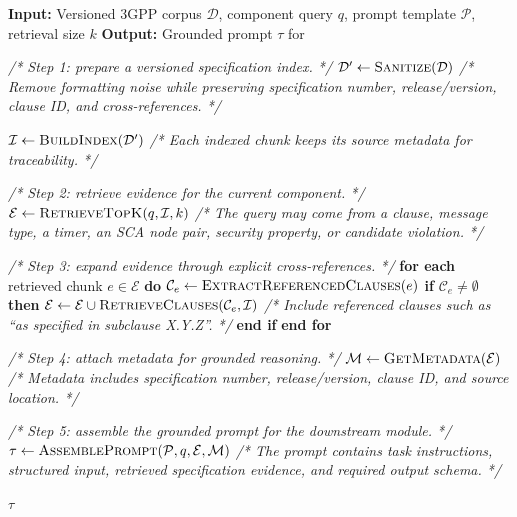 \begin{algorithm}[ht]
\caption{\textit{SpecAdaptation}}
\label{alg:rag_prompt}
\scriptsize
\begin{algorithmic}[1]

\State \textbf{Input:} Versioned 3GPP corpus $\mathcal{D}$, component query $q$, prompt template $\mathcal{P}$, retrieval size $k$
\State \textbf{Output:} Grounded prompt $\tau$ for \core

\State \textit{/* Step 1: prepare a versioned specification index. */}
\State $\mathcal{D}' \leftarrow \textsc{Sanitize}(\mathcal{D})$
\State \textit{/* Remove formatting noise while preserving specification number, release/version, clause ID, and cross-references. */}

\State $\mathcal{I} \leftarrow \textsc{BuildIndex}(\mathcal{D}')$
\State \textit{/* Each indexed chunk keeps its source metadata for traceability. */}

\State \textit{/* Step 2: retrieve evidence for the current component. */}
\State $\mathcal{E} \leftarrow \textsc{RetrieveTopK}(q,\mathcal{I},k)$
\State \textit{/* The query may come from a clause, message type, a timer, an SCA node pair, security property, or candidate violation. */}

\State \textit{/* Step 3: expand evidence through explicit cross-references. */}
\State \textbf{for each} retrieved chunk $e \in \mathcal{E}$ \textbf{do}
    \State \quad $\mathcal{C}_e \leftarrow \textsc{ExtractReferencedClauses}(e)$
    \State \quad \textbf{if} $\mathcal{C}_e \neq \emptyset$ \textbf{then}
        \State \quad\quad $\mathcal{E} \leftarrow \mathcal{E} \cup \textsc{RetrieveClauses}(\mathcal{C}_e,\mathcal{I})$
        \State \quad\quad \textit{/* Include referenced clauses such as ``as specified in subclause X.Y.Z''. */}
    \State \quad \textbf{end if}
\State \textbf{end for}

\State \textit{/* Step 4: attach metadata for grounded reasoning. */}
\State $\mathcal{M} \leftarrow \textsc{GetMetadata}(\mathcal{E})$
\State \textit{/* Metadata includes specification number, release/version, clause ID, and source location. */}

\State \textit{/* Step 5: assemble the grounded prompt for the downstream module. */}
\State $\tau \leftarrow \textsc{AssemblePrompt}(\mathcal{P}, q, \mathcal{E}, \mathcal{M})$
\State \textit{/* The prompt contains task instructions, structured input, retrieved specification evidence, and required output schema. */}

\State \Return $\tau$

\end{algorithmic}
\end{algorithm}



